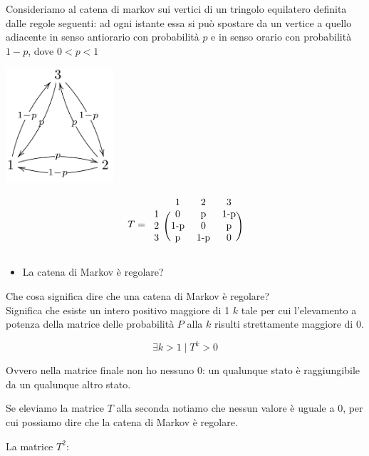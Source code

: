 \documentclass{article}
\begin{document}
Consideriamo al catena di markov sui vertici di un tringolo equilatero definita dalle regole seguenti: ad ogni istante essa si può spostare da un vertice a quello adiacente in senso antiorario con probabilità $p$ e in senso orario con probabilità $1-p$, dove $0<p<1$

\begin{center}
	\includegraphics[width=4cm]{./immagini/es5}
\end{center}
\[
T = 
\begin{blockarray}{cccc}
	& 1 & 2 & 3 \\
	\begin{block}{c(ccc)}
		1 &	0     & $p$   & $1-p$ \\
		2 &	$1-p$ & 0     &  $p$  \\
		3 &	$p$  & $1-p$   & 0  \\
	\end{block}
\end{blockarray}
\]

\begin{itemize}
	\item La catena di Markov è regolare?
\end{itemize}

\begin{mdframed}[hidealllines=true,backgroundcolor=blue!20]
	Che cosa significa dire che una catena di Markov è regolare? \\
	Significa che esiste un intero positivo maggiore di 1 $k$ tale per cui l'elevamento a potenza della matrice delle probabilità $P$ alla $k$ risulti strettamente maggiore di 0. 
	
	\[ \exists k > 1  \; | \;  T^{k} > 0 \]
	
	Ovvero nella matrice finale non ho nessuno 0: un qualunque stato è raggiungibile da un qualunque altro stato.
\end{mdframed}

Se eleviamo la matrice $T$ alla seconda notiamo che nessun valore è uguale a 0, per cui possiamo dire che la catena di Markov è regolare.

La matrice $T^{2}$:
\end{document}

